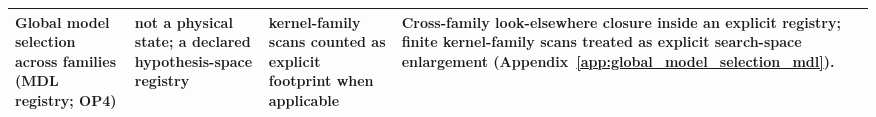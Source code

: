 \begin{center}
\begin{tabular}{p{} p{} p{} p{}}
Global model selection across families (MDL registry; OP4) & not a physical state; a declared hypothesis-space registry & kernel-family scans counted as explicit footprint when applicable & Cross-family look-elsewhere closure inside an explicit registry; finite kernel-family scans treated as explicit search-space enlargement (Appendix~\ref{app:global_model_selection_mdl}). \\
\bottomrule
\end{tabular}
\end{center}